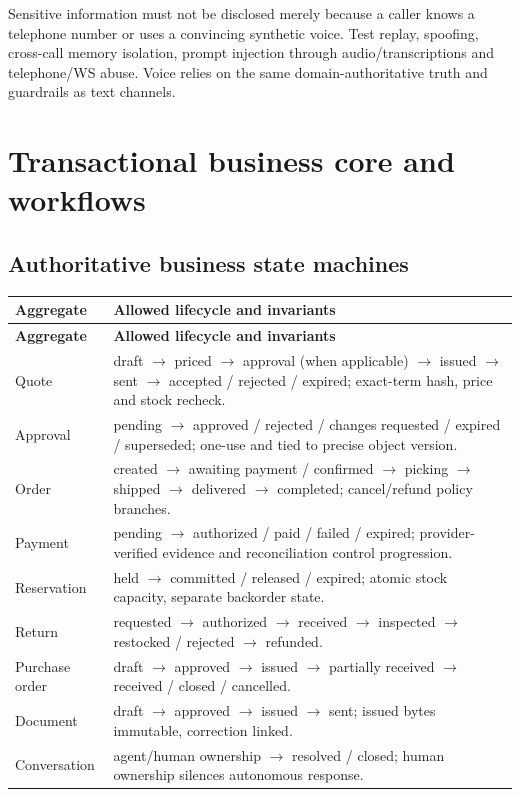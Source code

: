 \documentclass[10.5pt,a4paper,oneside]{article}
\begin{document}
Sensitive information must not be disclosed merely because a caller knows a telephone number or uses a convincing synthetic voice. Test replay, spoofing, cross-call memory isolation, prompt injection through audio/transcriptions and telephone/WS abuse. Voice relies on the same domain-authoritative truth and guardrails as text channels.

\section{Transactional business core and workflows}
\subsection{Authoritative business state machines}
\small
\begin{longtable}{@{}L{30mm}L{130mm}@{}}
\toprule{}\textbf{Aggregate} & \textbf{Allowed lifecycle and invariants}\\\midrule
\endfirsthead\toprule{}\textbf{Aggregate} & \textbf{Allowed lifecycle and invariants}\\\midrule\endhead
Quote & draft $\rightarrow$ priced $\rightarrow$ approval (when applicable) $\rightarrow$ issued $\rightarrow$ sent $\rightarrow$ accepted / rejected / expired; exact-term hash, price and stock recheck.\\
Approval & pending $\rightarrow$ approved / rejected / changes requested / expired / superseded; one-use and tied to precise object version.\\
Order & created $\rightarrow$ awaiting payment / confirmed $\rightarrow$ picking $\rightarrow$ shipped $\rightarrow$ delivered $\rightarrow$ completed; cancel/refund policy branches.\\
Payment & pending $\rightarrow$ authorized / paid / failed / expired; provider-verified evidence and reconciliation control progression.\\
Reservation & held $\rightarrow$ committed / released / expired; atomic stock capacity, separate backorder state.\\
Return & requested $\rightarrow$ authorized $\rightarrow$ received $\rightarrow$ inspected $\rightarrow$ restocked / rejected $\rightarrow$ refunded.\\
Purchase order & draft $\rightarrow$ approved $\rightarrow$ issued $\rightarrow$ partially received $\rightarrow$ received / closed / cancelled.\\
Document & draft $\rightarrow$ approved $\rightarrow$ issued $\rightarrow$ sent; issued bytes immutable, correction linked.\\
Conversation & agent/human ownership $\rightarrow$ resolved / closed; human ownership silences autonomous response.\\
\bottomrule
\end{longtable}\normalsize
\end{document}
